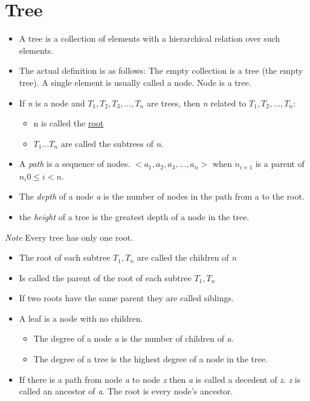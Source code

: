 \documentclass{article}
\begin{document}
\section{Tree}
\begin{itemize}
\item A tree is a collection of elements with a hierarchical relation over such elements.
\item The actual definition is as follows: The empty collection is a tree (the empty tree). A single element is usually called a node. Node is a tree.
\item If \textit{n} is a node and $T_1, T_2, T_3, \ldots , T_n$ are trees, then \textit{n} related to $T_1, T_2, \ldots, T_n$:
\begin{itemize}
    \item n is called the \underline{root}
    \item $T_1 \ldots T_n$ are called the subtrees of \textit{n}.
\end{itemize}
\item A \textit{path} is a sequence of nodes. $<a_1, a_2, a_3, \ldots, a_n>$ when $n_{i+1}$ is a parent of $n_i 0 \leq i < n$.
\item The \textit{depth} of a node \textit{a} is the number of nodes in the path from a to the root.
\item the \textit{height} of a tree is the greatest depth of a node in the tree.
\end{itemize}

\textit{Note} Every tree has only one root.

\begin{itemize}
\item[Child] The root of each subtree $T_1, T_n$ are called the children of \textit{n}
\item[n] Is called the parent of the root of each subtree $T_1, T_n$
\item[Siblings] If two roots have the same parent they are called siblings.
\item[Leaf] A leaf is a node with no children.
\begin{itemize}
    \item[Degree] The degree of a node \textit{a} is the number of children of \textit{a}.
    \item The degree of a tree is the highest degree of a node in the tree.
\end{itemize}
\item[decedent/ancestor] If there is a path from node \textit{a} to node \textit{z} then \textit{a} is called a decedent of \textit{z}. \textit{z} is called an ancestor of \textit{a}. The root is every node's ancestor.
\end{itemize}
\end{document}
